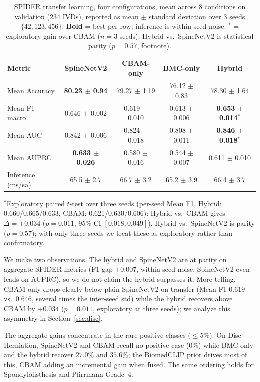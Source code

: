 \documentclass[runningheads]{llncs}
\newcommand{\best}[1]{\textcolor{best}{\textbf{#1}}}
\begin{document}
\begin{table}[ht]
\centering
\caption{SPIDER transfer learning, four configurations, mean across 8 conditions on validation (234 IVDs), reported as mean $\pm$ standard deviation over 3 seeds $\{42, 123, 456\}$. \textbf{Bold} = best per row; inference is within seed noise. $^\ast$ = exploratory gain over CBAM ($n=3$ seeds); Hybrid vs.\ SpineNetV2 is statistical parity ($p=0.57$, footnote).}
\label{tab:spider_transfer_agg}
\footnotesize
\begin{tabular}{@{}lcccc@{}}
\toprule
Metric & SpineNetV2 & CBAM-only & BMC-only & Hybrid \\
\midrule
Mean Accuracy & \best{80.23 $\pm$ 0.94} & 79.27 $\pm$ 1.19 & 76.12 $\pm$ 0.83 & 78.30 $\pm$ 1.64 \\
Mean F1 macro & 0.646 $\pm$ 0.002 & 0.619 $\pm$ 0.010 & 0.613 $\pm$ 0.006 & \best{0.653 $\pm$ 0.014}$^\ast$ \\
Mean AUC      & 0.842 $\pm$ 0.006 & 0.824 $\pm$ 0.018 & 0.808 $\pm$ 0.011 & \best{0.846 $\pm$ 0.018}$^\ast$ \\
Mean AUPRC    & \best{0.633 $\pm$ 0.026} & 0.580 $\pm$ 0.016 & 0.544 $\pm$ 0.007 & 0.611 $\pm$ 0.010 \\
\midrule
Inference (ms/sa) & 65.5 $\pm$ 2.7 & 66.7 $\pm$ 3.2 & 65.2 $\pm$ 3.9 & 66.4 $\pm$ 3.7 \\
\bottomrule
\end{tabular}

\vspace{2pt}
{\raggedright\scriptsize
$^\ast$Exploratory paired $t$-test over three seeds (per-seed Mean F1, Hybrid: 0.660/0.665/0.633, CBAM: 0.621/0.630/0.606): Hybrid vs.\ CBAM gives $\Delta=+0.034$ ($p=0.011$, 95\% CI $[0.018,0.049]$), Hybrid vs.\ SpineNetV2 is parity ($p=0.57$); with only three seeds we treat these as exploratory rather than confirmatory.\par}
\end{table}

We make two observations. The hybrid and SpineNetV2 are at parity on aggregate SPIDER metrics (F1 gap $+0.007$, within seed noise; SpineNetV2 even leads on AUPRC), so we do not claim the hybrid surpasses it. More telling, CBAM-only drops clearly below plain SpineNetV2 on transfer (Mean F1 $0.619$ vs.\ $0.646$, several times the inter-seed std) while the hybrid recovers above CBAM by $+0.034$ ($p=0.011$, exploratory at three seeds); we analyze this asymmetry in Section~\ref{sec:disc}.

The aggregate gains concentrate in the rare positive classes ($\leq 5\%$). On Disc Herniation, SpineNetV2 and CBAM recall no positive case ($0\%$) while BMC-only and the hybrid recover $27.0\%$ and $35.6\%$; the BiomedCLIP prior drives most of this, CBAM adding an incremental gain when fused. The same ordering holds for Spondylolisthesis and Pfirrmann Grade~4.
\end{document}
